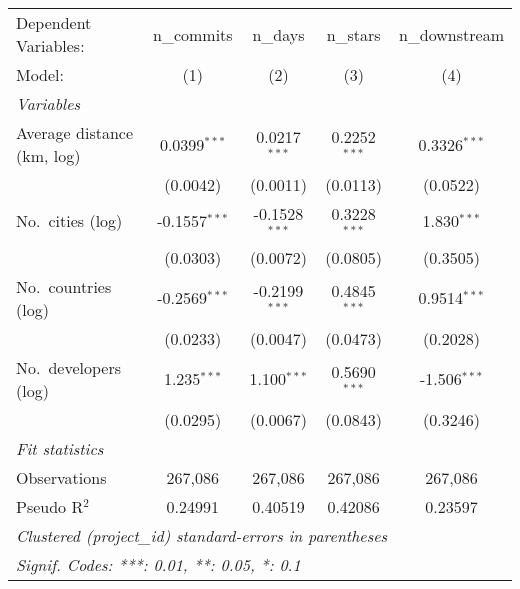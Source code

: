 
\begingroup
\centering
\begin{tabular}{lcccc}
   \tabularnewline \midrule \midrule
   Dependent Variables: & n\_commits      & n\_days         & n\_stars       & n\_downstream\\   
   Model:               & (1)             & (2)             & (3)            & (4)\\  
   \midrule
   \emph{Variables}\\
   Average distance (km, log)    & 0.0399$^{***}$  & 0.0217$^{***}$  & 0.2252$^{***}$ & 0.3326$^{***}$\\   
                        & (0.0042)        & (0.0011)        & (0.0113)       & (0.0522)\\   
   No.~cities (log)        & -0.1557$^{***}$ & -0.1528$^{***}$ & 0.3228$^{***}$ & 1.830$^{***}$\\   
                        & (0.0303)        & (0.0072)        & (0.0805)       & (0.3505)\\   
   No.~countries (log)     & -0.2569$^{***}$ & -0.2199$^{***}$ & 0.4845$^{***}$ & 0.9514$^{***}$\\   
                        & (0.0233)        & (0.0047)        & (0.0473)       & (0.2028)\\   
   No.~developers (log)    & 1.235$^{***}$   & 1.100$^{***}$   & 0.5690$^{***}$ & -1.506$^{***}$\\   
                        & (0.0295)        & (0.0067)        & (0.0843)       & (0.3246)\\   
   \midrule
   \emph{Fit statistics}\\
   Observations         & 267,086         & 267,086         & 267,086        & 267,086\\  
   Pseudo R$^2$         & 0.24991         & 0.40519         & 0.42086        & 0.23597\\  
   \midrule \midrule
   \multicolumn{5}{l}{\emph{Clustered (project\_id) standard-errors in parentheses}}\\
   \multicolumn{5}{l}{\emph{Signif. Codes: ***: 0.01, **: 0.05, *: 0.1}}\\
\end{tabular}
\par\endgroup


